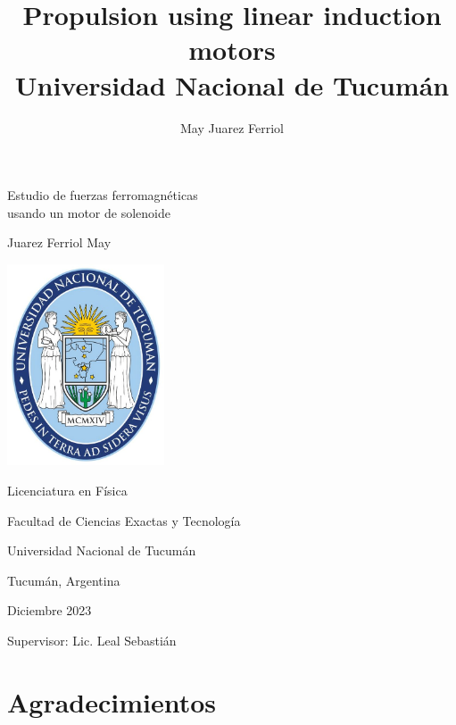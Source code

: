 \documentclass[a4paper,12pt]{article}
\title{Propulsion using linear induction motors\\ 
\medskip \large Universidad Nacional de Tucumán}
\author{May Juarez Ferriol}
\date{}
\begin{document}
\begin{titlepage}

    \begin{center}

        \vspace*{2cm}

        \Huge
        Estudio de fuerzas ferromagnéticas \\
        usando un motor de solenoide

        \vspace{1cm}

        \LARGE
        Juarez Ferriol May

        \vspace{1cm}

        \includegraphics[width=0.35\textwidth]{unt.jpg}

        \vspace{1cm}

        \Large
        Licenciatura en Física

        Facultad de Ciencias Exactas y Tecnología

        Universidad Nacional de Tucumán

        Tucumán, Argentina

        \vspace{1cm}

        Diciembre 2023

        \vspace{1cm}

        Supervisor: Lic. Leal Sebastián

    \end{center}

\end{titlepage}

\section*{Agradecimientos}
\end{document}
